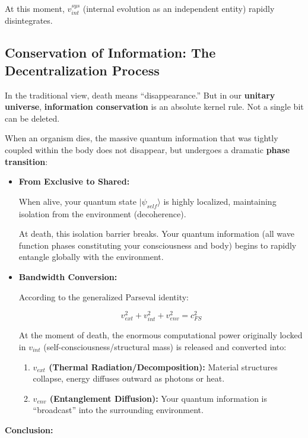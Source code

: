 At this moment, \textbf{$v_{int}^{sys}$} (internal evolution as an independent entity) rapidly disintegrates.

\subsection{Conservation of Information: The Decentralization Process}

In the traditional view, death means ``disappearance.'' But in our \textbf{unitary universe}, \textbf{information conservation} is an absolute kernel rule. Not a single bit can be deleted.

When an organism dies, the massive quantum information that was tightly coupled within the body does not disappear, but undergoes a dramatic \textbf{phase transition}:

\begin{itemize}
\item \textbf{From Exclusive to Shared:}

    When alive, your quantum state \textbf{$|\psi_{self}\rangle$} is highly localized, maintaining isolation from the environment (decoherence).

    At death, this isolation barrier breaks. Your quantum information (all wave function phases constituting your consciousness and body) begins to rapidly entangle globally with the environment.

\item \textbf{Bandwidth Conversion:}

    According to the generalized Parseval identity:

    $$v_{ext}^2 + v_{int}^2 + v_{env}^2 = c_{FS}^2$$

    At the moment of death, the enormous computational power originally locked in \textbf{$v_{int}$} (self-consciousness/structural mass) is released and converted into:

    \begin{enumerate}
    \item \textbf{$v_{ext}$ (Thermal Radiation/Decomposition):} Material structures collapse, energy diffuses outward as photons or heat.

    \item \textbf{$v_{env}$ (Entanglement Diffusion):} Your quantum information is ``broadcast'' into the surrounding environment.
    \end{enumerate}
\end{itemize}

\textbf{Conclusion:}

